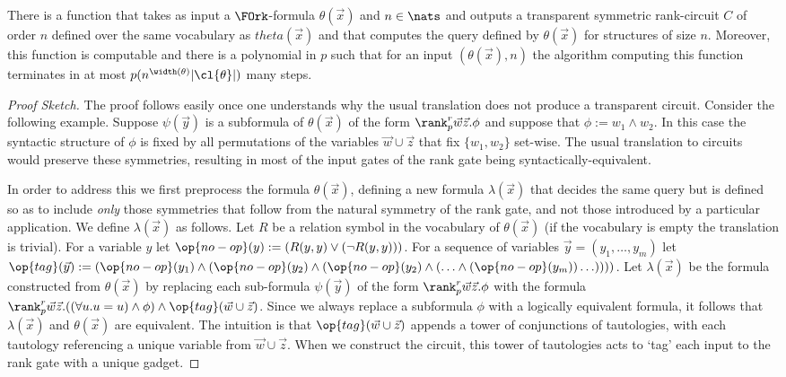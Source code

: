 \documentclass[a4paper,UKenglish]{lipics-v2018}
\begin{document}
\begin{lemma}
  There is a function that takes as input a $\FOrk$-formula $\theta(\vec{x})$
  and $n \in \nats$ and outputs a transparent symmetric rank-circuit $C$ of
  order $n$ defined over the same vocabulary as $theta(\vec{x})$ and that
  computes the query defined by $\theta(\vec{x})$ for structures of size $n$.
  Moreover, this function is computable and there is a polynomial in $p$ such
  that for an input $(\theta(\vec{x}), n)$ the algorithm computing this function
  terminates in at most $p(n^{\width(\theta)}\vert \cl{\theta} \vert)$ many
  steps.
  \label{lem:translating-FOrk}
  
\end{lemma}
\begin{proof}[Proof Sketch]
  
  The proof follows easily once one understands why the usual translation does
  not produce a transparent circuit. Consider the following example. Suppose
  $\psi(\vec{y})$ is a subformula of $\theta(\vec{x})$ of the form $\rank^r_p
  \vec{w} \vec{z} . \phi$ and suppose that $\phi := w_1 \land w_2$. In this case
  the syntactic structure of $\phi$ is fixed by all permutations of the
  variables $\vec{w} \cup \vec{z}$ that fix $\{w_1, w_2\}$ set-wise. The usual
  translation to circuits would preserve these symmetries, resulting in most of
  the input gates of the rank gate being syntactically-equivalent.
  
  In order to address this we first preprocess the formula $\theta(\vec{x})$,
  defining a new formula $\lambda (\vec{x})$ that decides the same query but is
  defined so as to include \emph{only} those symmetries that follow from the
  natural symmetry of the rank gate, and not those introduced by a particular
  application. We define $\lambda(\vec{x})$ as follows. Let $R$ be a relation
  symbol in the vocabulary of $\theta(\vec{x})$ (if the vocabulary is empty the
  translation is trivial). For a variable $y$ let $\op{no-op}(y) := (R(y, y)
  \lor (\neg R(y, y)))$. For a sequence of variables $\vec{y} = (y_1, \ldots,
  y_m)$ let $\op{tag} (\vec{y}) := (\op{no-op}(y_1) \land (\op{no-op}(y_2) \land
  ( \op{no-op}(y_2) \land ( \ldots \land (\op{no-op}(y_m)) \ldots))))$. Let
  $\lambda (\vec{x})$ be the formula constructed from $\theta(\vec{x})$ by
  replacing each sub-formula $\psi(\vec{y})$ of the form $\rank^r_p \vec{w}
  \vec{z} . \phi$ with the formula $\rank^r_p \vec{w}\vec{z} . ((\forall u . u =
  u) \land \phi) \land \op{tag}(\vec{w} \cup \vec{z})$. Since we always replace
  a subformula $\phi$ with a logically equivalent formula, it follows that
  $\lambda (\vec{x})$ and $\theta (\vec{x})$ are equivalent. The intuition is
  that $\op{tag}(\vec{w} \cup \vec{z})$ appends a tower of conjunctions of
  tautologies, with each tautology referencing a unique variable from $\vec{w}
  \cup \vec{z}$. When we construct the circuit, this tower of tautologies acts
  to `tag' each input to the rank gate with a unique gadget.


\end{proof}
\end{document}
